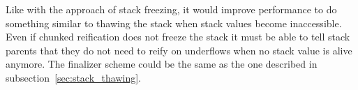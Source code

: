 Like with the approach of stack freezing, it would improve performance to do
something similar to thawing the stack when stack values become inaccessible.
Even if chunked reification does not freeze the stack it must be able to tell
stack parents that they do not need to reify on underflows when no stack value
is alive anymore.  The finalizer scheme could be the same as the one described in
subsection~\ref{sec:stack_thawing}.
